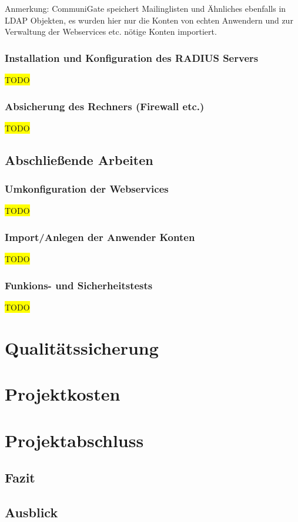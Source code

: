 \documentclass[11pt,a4paper,titlepage=firstiscover]{scrartcl} %
\newcommand{\hilight}[1]{\colorbox{yellow}{#1}} %
\begin{document}
Anmerkung: CommuniGate speichert Mailinglisten und \"Ahnliches ebenfalls in LDAP Objekten, es wurden hier nur die Konten von echten Anwendern und zur Verwaltung der Webservices etc. n\"otige Konten importiert.

\subsubsection{Installation und Konfiguration des RADIUS Servers}\label{sec:RADIUS-Konf}
\hilight{TODO}
\subsubsection{Absicherung des Rechners (Firewall etc.)}
\hilight{TODO}

\subsection{Abschlie\ss{}ende Arbeiten}
\subsubsection{Umkonfiguration der Webservices}
\hilight{TODO}
\subsubsection{Import/Anlegen der Anwender Konten}
\hilight{TODO}
\subsubsection{Funkions- und Sicherheitstests}
\hilight{TODO}


\newpage
\section{Qualit\"atssicherung}
\section{Projektkosten}
\section{Projektabschluss}
\subsection{Fazit}
\subsection{Ausblick}
\end{document}
